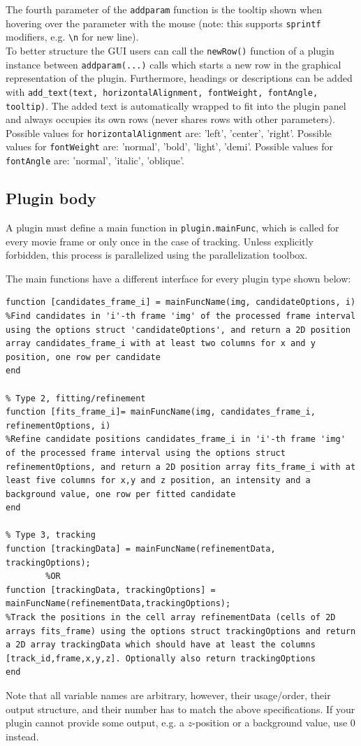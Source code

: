 \documentclass[11pt,onside]{report}
\numberwithin{equation}{chapter}
\begin{document}
The fourth parameter of the \texttt{add\textunderscore param} function is the tooltip shown when hovering over the parameter with the mouse (note: this supports \texttt{sprintf} modifiers, e.g. \texttt{\textbackslash{}n} for new line). \\

To  better structure the GUI users can call the \texttt{newRow()} function of a plugin instance between \texttt{add\textunderscore param(...)} calls which starts a new row in the graphical representation of the plugin. Furthermore, headings or descriptions can be added with \texttt{add\_text(text, horizontalAlignment, fontWeight, fontAngle, tooltip)}. The added text is automatically wrapped to fit into the plugin panel and always occupies its own rows (never shares rows with other parameters).   Possible values for \texttt{horizontalAlignment} are: 'left', 'center', 'right'.  Possible values for \texttt{fontWeight} are: 'normal', 'bold', 'light', 'demi'. Possible values for \texttt{fontAngle} are: 'normal', 'italic', 'oblique'.

\subsection{Plugin body}
A plugin must define a main function in \texttt{plugin.mainFunc}, which is called for every movie frame or only once in the case of tracking. Unless explicitly forbidden, this process is parallelized using the parallelization toolbox.

The main functions have a different interface for every plugin type shown below:
\begin{lstlisting}[style=Matlab-editor]
% Type 1, candidate detection
function [candidates_frame_i] = mainFuncName(img, candidateOptions, i)
%Find candidates in 'i'-th frame 'img' of the processed frame interval using the options struct 'candidateOptions', and return a 2D position array candidates_frame_i with at least two columns for x and y position, one row per candidate
end
  
% Type 2, fitting/refinement
function [fits_frame_i]= mainFuncName(img, candidates_frame_i, refinementOptions, i)
%Refine candidate positions candidates_frame_i in 'i'-th frame 'img' of the processed frame interval using the options struct refinementOptions, and return a 2D position array fits_frame_i with at least five columns for x,y and z position, an intensity and a background value, one row per fitted candidate
end

% Type 3, tracking
function [trackingData] = mainFuncName(refinementData, trackingOptions);
        %OR
function [trackingData, trackingOptions] = mainFuncName(refinementData,trackingOptions);
%Track the positions in the cell array refinementData (cells of 2D arrays fits_frame) using the options struct trackingOptions and return a 2D array trackingData which should have at least the columns [track_id,frame,x,y,z]. Optionally also return trackingOptions
end
\end{lstlisting}
Note that all variable names are arbitrary, however, their usage/order, their output structure, and their number has to match the above specifications. If your plugin cannot provide some output, e.g. a $z$-position or a background value, use 0 instead. 
\end{document}
